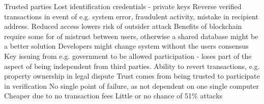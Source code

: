 Trusted parties 
Lost identification credentials - private keys
Reverse verified transactions in event of e.g. system error, fraudulent activity, mistake in recipient address. 
Reduced access lowers risk of outsider attack    
Benefits of blockchain require some for of mistrust between users, otherwise a shared database might be a better solution
Developers might change system without the users consensus 
Key issuing from e.g. government to be allowed participation - loses part of the aspect of being independent from third parties. 
Ability to revert transactions, e.g. property ownership in legal dispute 
Trust comes from being trusted to participate in verification
No single point of failure, as not dependent on one single computer
Cheaper due to no transaction fees 
Little or no chance of 51\% attacks
